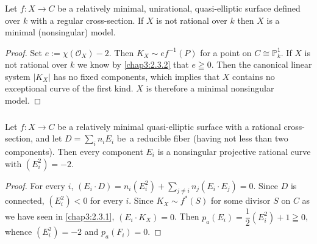\subsubsection{}\label{chap3:2.3.3}
\begin{coro*}
  Let $f:X\to C$ be a relatively minimal, unirational, quasi-elliptic
  surface defined over $k$ with a regular cross-section. If $X$ is not
  rational over $k$ then $X$ is a minimal (nonsingular) model.
\end{coro*}

\begin{proof}
Set $e:=\chi(\mathscr{O}_{X})-2$. Then $K_{X}\sim ef^{-1}(P)$ for a
point on $C\cong \mathbb{P}^{1}_{k}$. If $X$ is not rational over $k$
we know by \ref{chap3:2.3.2} that $e\geqq 0$. Then the canonical linear
system $|K_{X}|$ has no fixed components, which implies that $X$
contains no exceptional curve of the first kind. $X$ is therefore a
minimal nonsingular model.
\end{proof}

\subsubsection{}\label{chap3:2.3.4}
\begin{lemma*}
  Let $f:X\to C$ be a relatively minimal quasi-elliptic surface with a
  rational cross-section, and let
  $D={\displaystyle{\mathop{\sum}_{i}}}n_{i}E_{i}$ be\pageoriginale\ a
  reducible fiber (having not less than two components). Then every
  component $E_{i}$ is a nonsingular projective rational curve with
  $(E^{2}_{i})=-2$. 
\end{lemma*}

\begin{proof}
For every $i$, $(E_{i}\cdot
D)=n_{i}(E^{2}_{i})+{\displaystyle{\mathop{\sum}_{j\neq
      i}}}n_{j}(E_{i}\cdot E_{j})=0$. Since $D$ is connected,
$(E^{2}_{i})<0$ for every $i$. Since $K_{X}\sim f^{\ast}(S)$ for some
divisor $S$ on $C$ as we have seen in \ref{chap3:2.3.1}, $(E_{i}\cdot
K_{X})=0$. Then $p_{a}(E_{i})=\dfrac{1}{2}(E^{2}_{i})+1\geqq 0$,
whence $(E^{2}_{i})=-2$ and $p_{a}(F_{i})=0$.
\end{proof}



